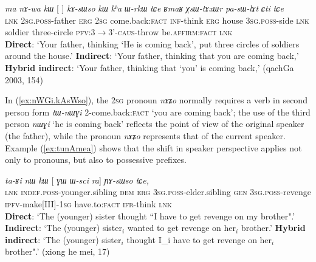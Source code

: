 \documentclass[oldfontcommands,oneside,a4paper,11pt]{article}
\newcommand{\ipa}[1]{{\phon\textit{#1}}} %
\newcommand{\refb}[1]{(\ref{#1})}
\newcommand{\bleu}[1]{{\color{blue}#1}}
\newcommand{\rouge}[1]{{\color{red}#1}}
\begin{document}
\begin{exe}
\ex \label{ex:nWGi.kAsWso}
\gll 
\ipa{ma} \ipa{nɤ-wa}  	\ipa{kɯ}  	[\rouge{\ipa{nɤʑo}} 	\bleu{\ipa{nɯɣi}}]  	\ipa{kɤ-sɯso}  	\ipa{kɯ}  	\ipa{kʰa}  	\ipa{ɯ-rkɯ} \ipa{tɕe} 	\ipa{ʁmaʁ}  	\ipa{χsɯ-tɤxɯr}  	\ipa{pa-sɯ-lɤt}  	\ipa{ɕti}  	\ipa{tɕe}  \\
\textsc{lnk} \textsc{2sg.poss}-father \textsc{erg} \textsc{2sg} {come.back:\textsc{fact}}  \textsc{inf}-think \textsc{erg} house \textsc{3sg.poss}-side \textsc{lnk} soldier three-circle \textsc{pfv:3$\rightarrow$3'-caus}-throw be.\textsc{affirm}:\textsc{fact} \textsc{lnk}\\
\glt \textbf{Direct}: `Your father, thinking `\bleu{He is coming back}',   put three circles of soldiers around the house.' 
\glt  \textbf{Indirect}: `Your father, thinking that \rouge{you are coming back},'
\glt  \textbf{Hybrid indirect}: `Your father, thinking that `\rouge{you}' \bleu{is coming back},' (qachGa 2003, 154)
\end{exe}

In \refb{ex:nWGi.kAsWso}, the \textsc{2sg} pronoun \ipa{nɤʑo} normally requires a verb in second person form \ipa{tɯ-nɯɣi} 2-come.back:\textsc{fact} `you are coming back'; the use of the third person \ipa{nɯɣi} `he is coming back' reflects the point of view of the original speaker (the father), while the pronoun  \ipa{nɤʑo} represents that of the current speaker. Example \refb{ex:tunAmea} shows that the shift in speaker perspective applies not only to pronouns, but also to possessive prefixes.

\begin{exe}
\ex \label{ex:tunAmea}
\gll  \ipa{tɕendɤre}  	\ipa{ta-ʁi}  	\ipa{nɯ}  	\ipa{kɯ}  	[\rouge{\ipa{ɯ-pi}}  	\ipa{ɣɯ}  	\ipa{ɯ-sci}  	\bleu{\ipa{tu-nɤme-a}}  	\ipa{ra}] 	\ipa{ɲɤ-sɯso}  	\ipa{tɕe,}  	\\
\textsc{lnk}  \textsc{indef.poss}-younger.sibling \textsc{dem} \textsc{erg}  {\textsc{3sg.poss}-elder.sibling}  \textsc{gen} \textsc{3sg.poss}-revenge {\textsc{ipfv}-make[III]-\textsc{1sg}} have.to:\textsc{fact} \textsc{ifr}-think \textsc{lnk} \\
\glt  \textbf{Direct}: `The (younger) sister thought ``\bleu{I have to get revenge} on \bleu{my brother}".'
\glt  \textbf{Indirect}:  `The (younger) sister$_i$ \rouge{wanted to get revenge on her$_i$ brother}.'
\glt  \textbf{Hybrid indirect}:  `The (younger) sister$_i$ thought \bleu{I_i have to get revenge} on \rouge{her$_i$ brother}".' (xiong he mei, 17)
  \end{exe}
 
\end{document}
